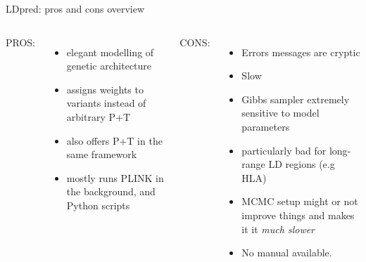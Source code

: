 \documentclass{beamer}
\begin{document}
   \begin{frame}{LDpred: pros and cons overview}
   \begin{columns}[t, onlytextwidth]
    \textcolor{example}{PROS:}
    \begin{itemize}
            \item elegant modelling of genetic architecture
            \item assigns weights to variants instead of arbitrary P+T
            \item also offers P+T in the same framework
            \item mostly runs PLINK in the background, and Python scripts
         \end{itemize}
    \alert{CONS:} 
        \begin{itemize}
            \item Errors messages are cryptic
            \item \alert{Slow}
            \item Gibbs sampler \alert{extremely sensitive to model parameters}
            \item particularly bad for long-range LD regions (e.g HLA)
            \item MCMC setup might or not improve things and makes it it \emph{much slower}
            \item No manual available. 
            \end{itemize}
            \end{columns}
     \end{frame}
     
\end{document}
